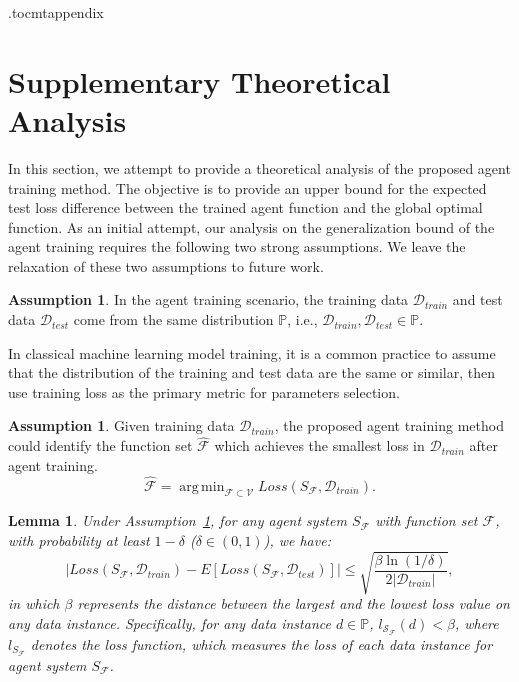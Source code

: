 \documentclass{article}
\theoremstyle{plain}
\newtheorem{lemma}[theorem]{Lemma}
\theoremstyle{definition}
\newtheorem{assumption}[theorem]{Assumption}
\theoremstyle{remark}
\DeclareMathOperator*{\argmin}{arg\,min}
\begin{document}




\onecolumn
\etocdepthtag.toc{mtappendix}

\renewcommand{\contentsname}{Appendix}
\tableofcontents

\clearpage
\appendix

\section{Supplementary Theoretical Analysis}
In this section, we attempt to provide a theoretical analysis of the proposed agent training method. The objective is to provide an upper bound for the expected test loss difference between the trained agent function and the global optimal function. 
As an initial attempt, our analysis on the generalization bound of the agent training requires the following two strong assumptions. We leave the relaxation of these two assumptions to future work. 
\begin{assumption} \label{assumption_1}
In the agent training scenario, the training data $\mathcal{D}_{train}$ and test data $\mathcal{D}_{test}$ come from the same distribution $\mathbb{P}$, i.e., \(\mathcal{D}_{train}, \mathcal{D}_{test} \in \mathbb{P}.\)
\end{assumption}
In classical machine learning model training, it is a common practice to assume that the distribution of the training and test data are the same or similar, then use training loss as the primary metric for parameters selection.

\begin{assumption} \label{assumption_2}
Given training data $\mathcal{D}_{train}$, the proposed agent training method could identify the function set $\hat{\mathcal{F}}$ which achieves the smallest loss in $\mathcal{D}_{train}$ after agent training.
\begin{equation}
    \hat{\mathcal{F}}  = \argmin_{\mathcal{F}\subset\mathcal{V}}Loss(S_{\mathcal{F}}, \mathcal{D}_{train}).
\end{equation}
\end{assumption}

\begin{lemma} \label{lemma:difference_between_empirical_and_expected}
   Under Assumption~\ref{assumption_1}, for any agent system $S_{\mathcal{F}}$ with function set $\mathcal{F}$, with probability at least \(1-\delta\) (\(\delta \in (0,1)\)), we have:
   \[
   |Loss(S_{\mathcal{F}}, \mathcal{D}_{train}) - E[Loss(S_{\mathcal{F}}, \mathcal{D}_{test})] | \leq \sqrt{\frac{\beta \ln(1/\delta)}{2|\mathcal{D}_{train}|}},
   \]
   in which \(\beta\) represents the distance between the largest and the lowest loss value on any data instance. Specifically,  for any data instance $d \in \mathbb{P}$, $l_{\mathcal{S_{\mathcal{F}}}}(d) <\beta$, where $l_{S_{\mathcal{F}}}$ denotes the loss function, which measures the loss of each data instance for agent system  $S_{\mathcal{F}}$.
\end{lemma}
\end{document}
